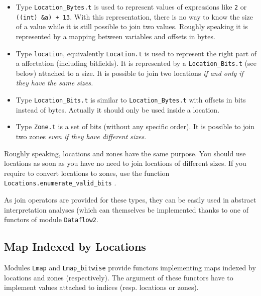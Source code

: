 \begin{itemize}
\item Type \texttt{Location\_Bytes.t}
  is used to represent values of \C expressions like \texttt{2} or
  \texttt{((int) \&a) + 13}. With this representation, there is no way to know
  the size of a value while it is still possible to join two values. Roughly
  speaking it is represented by a mapping between \C variables and offsets in
  bytes.
\item Type \texttt{location}, equivalently
  \texttt{Location.t} is used to represent the
  right part of a \C affectation (including bitfields). It is represented by a
  \texttt{Location\_Bits.t} (see below) attached to a size. It is possible to
  join two locations \emph{if and only if they have the same sizes.}
\item Type \texttt{Location\_Bits.t} is
  similar to \texttt{Location\_Bytes.t} with offsets in bits instead of
  bytes. Actually it should only be used inside a location.
\item Type \texttt{Zone.t} is a set of bits (without
  any specific order). It is possible to join two zones \emph{even if they have
    different sizes}.
\end{itemize}

\begin{convention}
  Roughly speaking, locations and zones have the same purpose. You should use
  locations as soon as you have no need to join locations of different sizes.
  If you require to convert locations to zones, use the function
  \texttt{Locations.enumerate\_valid\_bits}%
  .
\end{convention}

As join operators are provided for these types, they can be easily used in
abstract interpretation analyses (which can
themselves be implemented thanks to one of functors of module
\texttt{Dataflow2}.

\subsection{Map Indexed by Locations}\label{memory:map}

Modules \texttt{Lmap} and
\texttt{Lmap\_bitwise} provide functors implementing
maps indexed by locations and zones (respectively). The argument of these
functors have to implement values attached to indices (resp. locations or zones).

